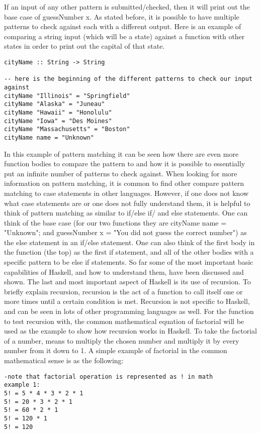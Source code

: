 \documentclass{article}
\begin{document}
If an input of any other pattern is submitted/checked, then it will print out the base case of guessNumber x.
As stated before, it is possible to have multiple patterns to check against each with a different output.
Here is an example of comparing a string input (which will be a state) against a function with other states in order to print out the capital of that state.
\begin{lstlisting}
cityName :: String -> String

-- here is the beginning of the different patterns to check our input against
cityName "Illinois" = "Springfield"
cityName "Alaska" = "Juneau"
cityName "Hawaii" = "Honolulu"
cityName "Iowa" = "Des Moines"
cityName "Massachusetts" = "Boston"
cityName name = "Unknown"
\end{lstlisting}
In this example of pattern matching it can be seen how there are even more function bodies to compare the pattern to and how it is possible to essentially put an infinite number of patterns to check against.
When looking for more information on pattern matching, it is common to find other compare pattern matching to case statements in other languages.
However, if one does not know what case statements are or one does not fully understand them, it is helpful to think of pattern matching as similar to if/else if/ and else statements.
One can think of the base case (for our two functions they are cityName name = "Unknown"; and guessNumber x = "You did not guess the correct number") as the else statement in an if/else statement.
One can also think of the first body in the function (the top) as the first if statement, and all of the other bodies with a specific pattern to be else if statements.
So far some of the most important basic capabilities of Haskell, and how to understand them, have been discussed and shown.
The last and most important aspect of Haskell is its use of recursion.
To briefly explain recursion, recursion is the act of a function to call itself one or more times until a certain condition is met.
Recursion is not specific to Haskell, and can be seen in lots of other programming languages as well.
For the function to test recursion with, the common mathematical equation of factorial will be used as the example to show how recursion works in Haskell.
To take the factorial of a number, means to multiply the chosen number and multiply it by every number from it down to 1.
A simple example of factorial in the common mathematical sense is as the following:
\begin{lstlisting}
-note that factorial operation is represented as ! in math
example 1:
5! = 5 * 4 * 3 * 2 * 1
5! = 20 * 3 * 2 * 1
5! = 60 * 2 * 1
5! = 120 * 1
5! = 120
\end{lstlisting}
\end{document}
